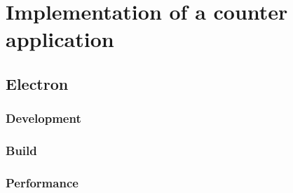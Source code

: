 \section{Implementation of a counter \\ application}
\label{sec:implementation}

\subsection{Electron}
\label{subsec:impl:electron}

\subsubsection{Development}
\label{subsubsec:impl:electron:dev}

\subsubsection{Build}
\label{subsubsec:impl:electron:build}

\subsubsection{Performance}
\label{subsubsec:impl:electron:performance}

